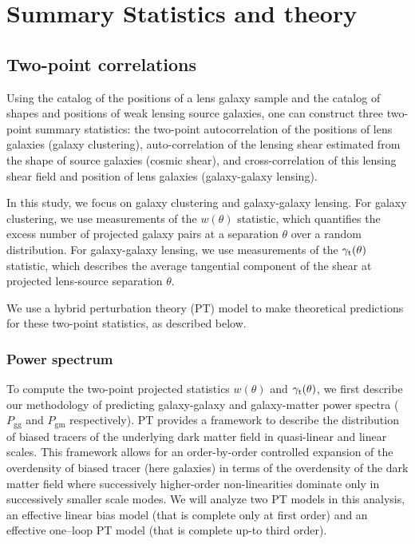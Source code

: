 \documentclass[fleqn,usenatbib]{mnras}
\newcommand{\gammat}{\ensuremath{\gamma_{\rm t}(\theta)}}
\newcommand{\wtheta}{\ensuremath{w(\theta)}}
\newcommand{\pgg}{\ensuremath{P_{\mathrm{gg}}}}
\newcommand{\pgm}{\ensuremath{P_{\mathrm{gm}}}}
\newcommand{\jdr}[1]{{\color{blue}[JDR: #1]}}
\begin{document}
\section{Summary Statistics and theory}
\label{sec:stat_theory}
\subsection{Two-point correlations}
Using the catalog of the positions of a lens galaxy sample and the catalog of shapes and positions of weak lensing source galaxies, one can construct three two-point summary statistics: the two-point autocorrelation of the positions of lens galaxies (galaxy clustering), auto-correlation of the lensing shear estimated from the shape of source galaxies (cosmic shear), and cross-correlation of this lensing shear field and position of lens galaxies (galaxy-galaxy lensing). 

In this study, we focus on galaxy clustering and galaxy-galaxy lensing. For galaxy clustering, we use measurements of the $w(\theta)$ statistic, which quantifies the excess number of projected galaxy pairs at a separation $\theta$ over a random distribution. For galaxy-galaxy lensing, we use measurements of the $\gamma_{\rm t}(\theta)$ statistic, which describes the average tangential component of the shear at projected lens-source separation $\theta$. 

We use a hybrid perturbation theory (PT) model to make theoretical predictions for these two-point statistics, as described below. 

\subsubsection{Power spectrum}
\label{sec:Pk_pred}

To compute the two-point projected statistics $\wtheta$ and $\gammat$, we first describe our methodology of predicting galaxy-galaxy and galaxy-matter power spectra ($\pgg$ and $\pgm$ respectively). PT provides a framework to describe the distribution of biased tracers of the underlying dark matter field in quasi-linear and linear scales. This framework allows for an order-by-order controlled expansion of the overdensity of biased tracer (here galaxies) in terms of the overdensity of the dark matter field where successively higher-order non-linearities dominate only in successively smaller scale modes. We will analyze two PT models in this analysis, an effective linear bias model (that is complete only at first order) and an effective one--loop PT model (that is complete up-to third order). 
\end{document}
